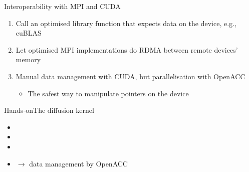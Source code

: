\documentclass[12pt,aspectratio=169]{beamer}
\begin{document}
\begin{frame}[fragile]{Interoperability with MPI and CUDA}
  \begin{enumerate}
  \item Call an optimised library function that expects data on the device,
    e.g., cuBLAS
  \item Let optimised MPI implementations do RDMA between remote devices' memory
  \item Manual data management with CUDA, but parallelisation with OpenACC
    \begin{itemize}
    \item The safest way to manipulate pointers on the device
    \end{itemize}
  \end{enumerate}
\end{frame}

\begin{frame}{Hands-on}{The diffusion kernel}
  \begin{itemize}
  \item {}
  \item {}
  \item {}
  \item {} $\rightarrow$ data management by OpenACC
  \end{itemize}
\end{frame}
\end{document}
